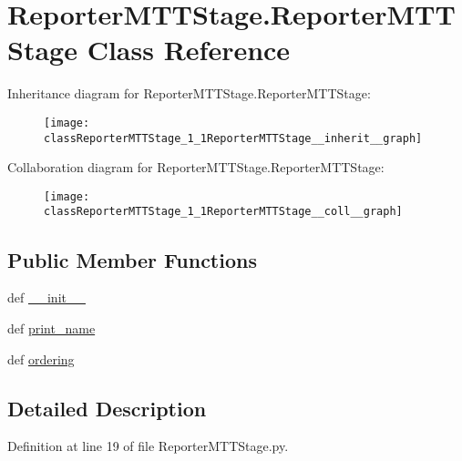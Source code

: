\hypertarget{classReporterMTTStage_1_1ReporterMTTStage}{\section{Reporter\-M\-T\-T\-Stage.\-Reporter\-M\-T\-T\-Stage Class Reference}
\label{classReporterMTTStage_1_1ReporterMTTStage}
}


Inheritance diagram for Reporter\-M\-T\-T\-Stage.\-Reporter\-M\-T\-T\-Stage\-:\nopagebreak
\begin{figure}[H]
\begin{center}
\leavevmode
\texttt{[image: classReporterMTTStage\_1\_1ReporterMTTStage\_\_inherit\_\_graph]}
\end{center}
\end{figure}


Collaboration diagram for Reporter\-M\-T\-T\-Stage.\-Reporter\-M\-T\-T\-Stage\-:\nopagebreak
\begin{figure}[H]
\begin{center}
\leavevmode
\texttt{[image: classReporterMTTStage\_1\_1ReporterMTTStage\_\_coll\_\_graph]}
\end{center}
\end{figure}
\subsection*{Public Member Functions}
\begin{DoxyCompactItemize}
\item 
def \hyperlink{classReporterMTTStage_1_1ReporterMTTStage_a4f2a0294d2deba045ad0793a566a54d3}{\-\_\-\-\_\-init\-\_\-\-\_\-}
\item 
def \hyperlink{classReporterMTTStage_1_1ReporterMTTStage_a23003328b3177053c6daed36e3b7a1a4}{print\-\_\-name}
\item 
def \hyperlink{classReporterMTTStage_1_1ReporterMTTStage_afd5aa92bf9223e37043d08a37c76c396}{ordering}
\end{DoxyCompactItemize}


\subsection{Detailed Description}


Definition at line 19 of file Reporter\-M\-T\-T\-Stage.\-py.



